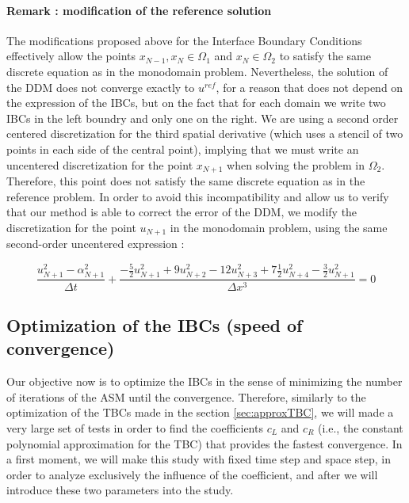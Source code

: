 \paragraph{Remark : modification of the reference solution}

\indent The modifications proposed above for the Interface Boundary Conditions effectively allow the points $x_{N-1},x_N \in \Omega_1$ and $x_N \in \Omega_2$ to satisfy the same discrete equation as in the monodomain problem. Nevertheless, the solution of the DDM does not converge exactly to $u^{ref}$, for a reason that does not depend on the expression of the IBCs, but on the fact that for each domain we write two IBCs in the left boundry and only one on the right. We are using a second order centered discretization for the third spatial derivative (which uses a stencil of two points in each side of the central point), implying that we must write an uncentered discretization for the point $x_{N+1}$ when solving the problem in $\Omega_2$. Therefore, this point does not satisfy the same discrete equation as in the reference problem. In order to avoid this incompatibility and allow us to verify that our method is able to correct the error of the DDM, we modify the discretization for the point $u_{N+1}$ in the monodomain problem, using the same second-order uncentered expression :

\begin{equation*}
    \label{eq:uncenteredFDdiscretizationN}
    \frac{u_{N+1}^2 - \alpha_{N+1}^2}{\Delta t} + \frac{-\frac{5}{2}u_{N+1}^2 + 9u_{N+2}^2 - 12 u_{N+3}^2 + 7\frac{1}{2}u_{N+4}^2 -\frac{3}{2}u_{N+1}^2}{\Delta x ^3} = 0
\end{equation*}

\subsection{Optimization of the IBCs (speed of convergence)}

\indent Our objective now is to optimize the IBCs in the sense of minimizing the number of iterations of the ASM until the convergence. Therefore, similarly to the optimization of the TBCs made in the section \ref{sec:approxTBC}, we will made a very large set of tests in order to find the coefficients $c_L$ and $c_R$ (i.e., the constant polynomial approximation for the TBC) that provides the fastest convergence. In a first moment, we will make this study with fixed time step and space step, in order to analyze exclusively the influence of the coefficient, and after we will introduce these two parameters into the study.

